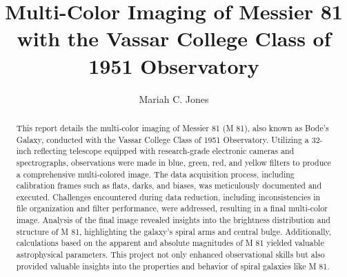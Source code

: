 \documentclass[]{aastex63}
\begin{document}
\title{Multi-Color Imaging of Messier 81 with the Vassar College Class of 1951 Observatory}

\author{Mariah C. Jones}

\begin{abstract}
This report details the multi-color imaging of Messier 81 (M 81), also known as Bode's Galaxy, conducted with the Vassar College Class of 1951 Observatory. Utilizing a 32-inch reflecting telescope equipped with research-grade electronic cameras and spectrographs, observations were made in blue, green, red, and yellow filters to produce a comprehensive multi-colored image. The data acquisition process, including calibration frames such as flats, darks, and biases, was meticulously documented and executed. Challenges encountered during data reduction, including inconsistencies in file organization and filter performance, were addressed, resulting in a final multi-color image. Analysis of the final image revealed insights into the brightness distribution and structure of M 81, highlighting the galaxy's spiral arms and central bulge. Additionally, calculations based on the apparent and absolute magnitudes of M 81 yielded valuable astrophysical parameters. This project not only enhanced observational skills but also provided valuable insights into the properties and behavior of spiral galaxies like M 81.
\end{abstract}
\end{document}
